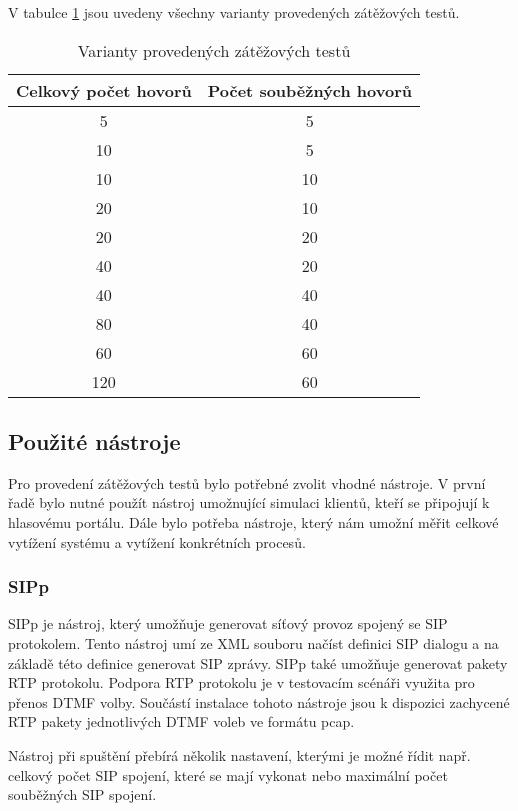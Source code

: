 \documentclass[ing,male,java,dept460]{diploma}						%
\begin{document}
V tabulce \ref{tab:Benchmark_variants} jsou uvedeny všechny varianty provedených zátěžových testů.

\begin{table}
	\centering
	\begin{tabular}{|c|c|}
		\hline
		Celkový počet hovorů & Počet souběžných hovorů \\
		\hline
		5 & 5  \\
		\hline
		10 & 5  \\
		\hline
		10 & 10  \\
		\hline
		20 & 10  \\
		\hline
		20 & 20  \\
		\hline
		40 & 20  \\
		\hline
		40 & 40  \\
		\hline
		80 & 40  \\
		\hline
		60 & 60  \\
		\hline
		120 & 60  \\
		\hline
	\end{tabular}
	\caption{Varianty provedených zátěžových testů}
	\label{tab:Benchmark_variants}
\end{table}


\subsection{Použité nástroje}
Pro provedení zátěžových testů bylo potřebné zvolit vhodné nástroje. V první řadě bylo nutné použít nástroj umožnující simulaci klientů, kteří se připojují k hlasovému portálu. Dále bylo potřeba nástroje, který nám umožní měřit celkové vytížení systému a vytížení konkrétních procesů.

\subsubsection{SIPp}
SIPp je nástroj, který umožňuje generovat síťový provoz spojený se SIP protokolem. Tento nástroj umí ze XML souboru načíst definici SIP dialogu a na základě této definice generovat SIP zprávy. SIPp také umožňuje generovat pakety RTP protokolu. Podpora RTP protokolu je v testovacím scénáři využita pro přenos DTMF volby. Součástí instalace tohoto nástroje jsou k dispozici zachycené RTP pakety jednotlivých DTMF voleb ve formátu pcap.

Nástroj při spuštění přebírá několik nastavení, kterými je možné řídit např. celkový počet SIP spojení, které se mají vykonat nebo maximální počet souběžných SIP spojení.
\end{document}
